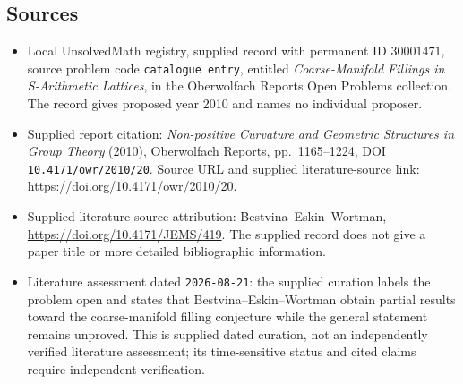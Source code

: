 \documentclass[11pt]{article}
\begin{document}
\subsection{Sources}
\begin{itemize}
\item Local UnsolvedMath registry, supplied record with permanent ID \(30001471\), source problem code \texttt{catalogue entry}, entitled \emph{Coarse-Manifold Fillings in S-Arithmetic Lattices}, in the Oberwolfach Reports Open Problems collection. The record gives proposed year 2010 and names no individual proposer.
\item Supplied report citation: \emph{Non-positive Curvature and Geometric Structures in Group Theory} (2010), Oberwolfach Reports, pp.\ 1165--1224, DOI \texttt{10.4171/owr/2010/20}. Source URL and supplied literature-source link: \url{https://doi.org/10.4171/owr/2010/20}.
\item Supplied literature-source attribution: Bestvina--Eskin--Wortman, \url{https://doi.org/10.4171/JEMS/419}. The supplied record does not give a paper title or more detailed bibliographic information.
\item Literature assessment dated \texttt{2026-08-21}: the supplied curation labels the problem open and states that Bestvina--Eskin--Wortman obtain partial results toward the coarse-manifold filling conjecture while the general statement remains unproved. This is supplied dated curation, not an independently verified literature assessment; its time-sensitive status and cited claims require independent verification.
\end{itemize}
\end{document}
